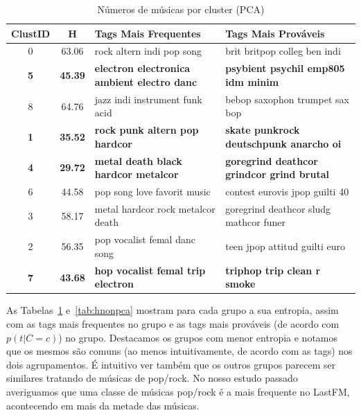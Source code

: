 \documentclass[brazil,a4paper,12pt]{article}
\begin{document}
\begin{table}
\centering
\small
\begin{tabular}{cc|ll}
\toprule
ClustID & H & Tags Mais Frequentes & Tags Mais Prováveis \\
\midrule
0	&	63.06 &          rock
         altern
         indi
         pop
         song & brit
         britpop
         colleg
         ben
         indi  \\
\textbf{5}	&	\textbf{45.39} & \textbf{electron
         electronica
         ambient
         electro
         danc} & \textbf{psybient
         psychil
         emp805
         idm
         minim}  \\
8	&	64.76 & jazz
         indi
         instrument
         funk
         acid & bebop
         saxophon
         trumpet
         sax
         bop  \\
\textbf{1}	&	\textbf{35.52} & \textbf{rock
         punk
         altern
         pop
         hardcor} & \textbf{skate
         punkrock
         deutschpunk
         anarcho
         oi}  \\
\textbf{4}	&	\textbf{29.72} & \textbf{metal
         death
         black
         hardcor
         metalcor} & \textbf{goregrind
         deathcor
         grindcor
         grind
         brutal}
  \\
6	&	44.58 & pop
         song
         love
         favorit
         music & contest
         eurovis
         jpop
         guilti
         40  \\
3	&	58.17 & metal
         hardcor
         rock
         metalcor
         death & goregrind
         deathcor
         sludg
         mathcor
         funer  \\
2	&	56.35 & pop
         vocalist
         femal
         danc
         song
 & teen
         jpop
         attitud
         guilti
         euro  \\
\textbf{7}	&	\textbf{43.68} & \textbf{hop
         vocalist
         femal
         trip
         electron} & \textbf{triphop
         trip
         clean
         r
         smoke}  \\
\bottomrule
\end{tabular}
\caption{Números de músicas por cluster (PCA)}
\label{tab:hpca}
\end{table}

As Tabelas~\ref{tab:hpca} e~\ref{tab:hnonpca} mostram para cada grupo a sua entropia, assim com as 
tags mais frequentes no grupo e as tags mais prováveis (de acordo com $p(t|C = c)$) no grupo.
Destacamos os grupos com menor entropia e notamos que os mesmos são comuns (ao menos intuitivamente,
de acordo com as tags) nos dois agrupamentos. É intuitivo ver também que os outros grupos parecem ser
similares tratando de músicas de pop/rock. No nosso estudo passado~\cite{figueiredo2009evidence}
averiguamos que uma classe de músicas pop/rock é a mais frequente no LastFM, acontecendo em mais 
da metade das músicas. 
\end{document}
